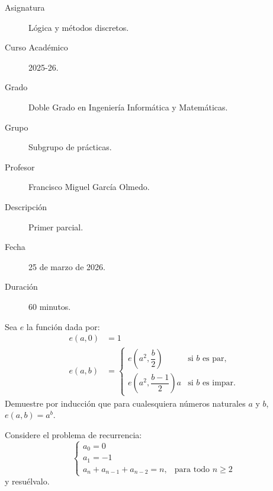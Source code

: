 \documentclass[12pt]{article}
\begin{document}

    
    

    \begin{description}
        \item[Asignatura] Lógica y métodos discretos.
        \item[Curso Académico] 2025-26.
        \item[Grado] Doble Grado en Ingeniería Informática y Matemáticas.
        \item[Grupo] Subgrupo de prácticas.
        \item[Profesor] Francisco Miguel García Olmedo.
        \item[Descripción] Primer parcial.
        \item[Fecha] 25 de marzo de 2026.
        \item[Duración] 60 minutos.
    \end{description}
    
    \newpage

    \begin{ejercicio}[5 puntos] Sea $e$ la función dada por:
        \begin{align}
            e(a,0) &= 1 \\
            e(a,b) &= \begin{cases}
            e\left(a^2, \dfrac{b}{2}\right) & \text{si } b \text{ es par}, \\[0.3cm]
            e\left(a^2, \dfrac{b-1}{2}\right) a & \text{si } b \text{ es impar}.
            \end{cases}
        \end{align}
        Demuestre por inducción que para cualesquiera números naturales $a$ y $b$, $e(a,b) = a^b$.
    \end{ejercicio}
    
    \begin{ejercicio}[5 puntos] Considere el problema de recurrencia:
        $$
        \begin{cases}
        a_0 = 0 \\
        a_1 = -1 \\
        a_n + a_{n-1} + a_{n-2} = n, & \text{para todo } n \ge 2
        \end{cases}
        $$
        y resuélvalo.
    \end{ejercicio}
\end{document}
